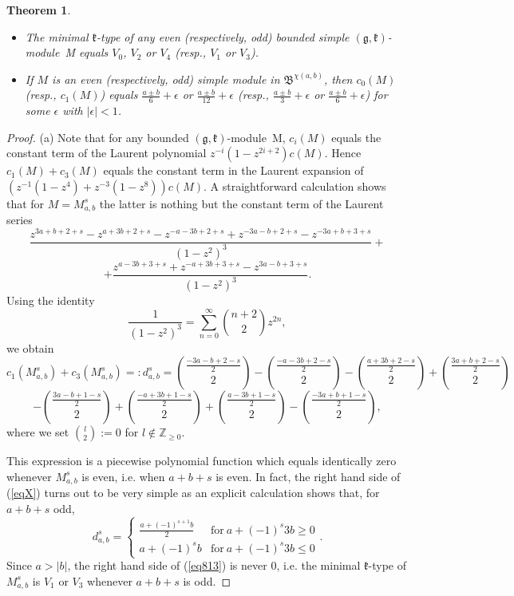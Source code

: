 \documentclass[12pt]{amsart}
\theoremstyle{plain} %
\newtheorem{theorem}[definition]{Theorem}
\newcommand {\ZZ} {\mathbb {Z}}
\newcommand{\kk}{\mathfrak{k}}
\renewcommand{\gg}{\mathfrak{g}}
\newcommand {\BB} {\mathfrak {B}}
\newcommand{\eps}{\epsilon}
\newcommand{\doublebrace}[4]{\left\{\begin{array}{ll}#1 & #2 \\ #3 & #4\end{array}\right.}
\newcommand {\eqdefrev} {=:}
\newcommand{\refeq}[1]{(\ref{#1})}
\newcommand {\gkm} {$(\gg,\kk)$-module}
\begin{document}
\begin {theorem}\label{th813}~

\begin {itemize}
\item[(a)] The minimal $\kk$-type of any even (respectively, odd) bounded simple \gkm~M equals $V_0$, $V_2$ or $V_4$ (resp., $V_1$ or $V_3$).
\item[(b)] If $M$ is an even (respectively, odd) simple module in $\BB^{\chi(a,b)}$, then $c_0(M)$ (resp., $c_1(M)$) equals $\displaystyle \frac{a\pm b}{6}+\eps$ or
$\displaystyle \frac{a\pm b}{12}+\eps$ (resp., $\displaystyle \frac{a\pm b}{3}+\eps$ or $\displaystyle \frac{a\pm b}{6}+\eps$) for some $\eps$ with $|\eps|<1$.
\end{itemize}
\end{theorem}
\begin{proof}
(a) Note that for any bounded \gkm~M, $c_i(M)$ equals the constant term of the Laurent polynomial $z^{-i}(1-z^{2i+2})c(M)$. Hence $c_1(M)+c_3(M)$ equals the constant term in the Laurent expansion of $(z^{-1}(1-z^4)+z^{-3}(1-z^8))c(M)$. A straightforward calculation shows that for $M=M_{a,b}^s$ the latter is nothing but the constant term of the Laurent series
\[
\frac{z^{3a+b+2+s}-z^{a+3b+2+s}-z^{-a-3b+2+s}+z^{-3a-b+2+s}-z^{-3a+b+3+s}}{(1-z^2)^3}+
\]
\[
+\frac {z^{a-3b+3+s}+z^{-a+3b+3+s}-z^{3a-b+3+s}}{(1-z^2)^3}.
\]
Using the identity
\begin{equation}\label{eq851}
\frac{1}{(1-z^2)^3}=\sum_{n=0}^{\infty}\binom{n+2}{2}z^{2n},
\end{equation}
we obtain
\begin{equation}
\label{eqX}
c_1(M_{a,b}^s)+c_3(M_{a,b}^s)\eqdefrev d_{a,b}^s=\binom{\frac{-3a-b+2-s}{2}}{2}-\binom{\frac{-a-3b+2-s}{2}}{2}-\binom{\frac{a+3b+2-s}{2}}{2}+\binom{\frac{3a+b+2-s}{2}}{2}
\end{equation}
\[
-\binom{\frac{3a-b+1-s}{2}}{2}+\binom{\frac{-a+3b+1-s}{2}}{2}+\binom{\frac{a-3b+1-s}{2}}{2}-\binom{\frac{-3a+b+1-s}{2}}{2},
\]
where we set $\binom{l}{2}:=0$ for $l\notin\ZZ_{\geq 0}$.

This expression is a piecewise polynomial function which equals identically zero whenever $M_{a,b}^s$ is even, i.e. when $a+b+s$ is even. In fact, the right hand side of \refeq{eqX} turns out to be very simple as an explicit calculation shows that, for $a+b+s$ odd,
\begin{equation}\label{eq813}
d_{a,b}^s=\doublebrace{\displaystyle\frac{a+(-1)^{s+1}b}{2}}{\mathrm{ for~} a+(-1)^s3b\geq 0}{a+(-1)^{s}b}{\mathrm{ for~} a+(-1)^s3b\leq 0}.
\end{equation}
Since $a>|b|$, the right hand side of \refeq{eq813} is never 0, i.e. the minimal $\kk$-type of $M_{a,b}^s$ is $V_1$ or $V_3$ whenever $a+b+s$ is odd.


\end{proof}
\end{document}
